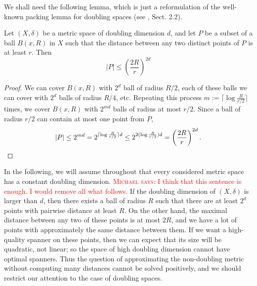 \documentclass[a4paper,USenglish]{socg-lipics-v2018}
\newcommand{\dist}{\delta}
\def\marrow{\marginpar[\hfill$\longrightarrow$]{$\longleftarrow$}}
\def\michael#1{\textcolor{red}{\textsc{Michael says: }{\marrow\sf #1}}}
\begin{document}
We shall need the following lemma, which is just a reformulation of the well-known
packing lemma for doubling spaces (see \cite{smid_2009}, Sect. 2.2).

\begin{lemma}
\label{lem:packing_lemma}
 Let $(X,\dist)$ be a metric space of doubling dimension $d$, and let $P$ be a subset of a ball 
 $B(x,R)$ in $X$ such that the distance between any two distinct points of $P$ is at least $r$.
 Then 
 \[|P|\leq \left(\frac{2R}{r}\right)^{2d}\]

\end{lemma}
\begin{proof}
We can cover $B(x,R)$ with $2^d$ ball of radius $R/2$, each of these balls we can cover with $2^d$
balls of radius $R/4$, etc. Repeating this process $m := \lceil \log \frac{R}{r/2} \rceil$ times, 
we cover
$B(x, R)$ with $2^{md}$ balls of radius at most $r/2$. Since a ball of radius $r/2$ can
contain at most one point from $P$, 
\[|P|\leq 2^{md}= 2^{\lceil \log \frac{R}{r/2} \rceil d}\leq 2^{2(\log \frac{R}{r/2})d}=\left(\frac{2R}{r}\right)^{2d}.\qedhere\]
\end{proof}

In the following, we will assume throughout that every considered metric space
has a constant doubling dimension.
\michael{I think that this sentence is enough. I would remove all what follows.}
If the doubling dimension of $(X, \dist)$ is larger than $d$, then
there exists a ball of radius $R$ such that there are at least $2^d$ points with pairwise distance at least $R$. On the other hand,
the maximal distance between any two of these points is at most $2R$, and we have a lot of points with approximately the same distance
between them. If we want a high-quality spanner on these points, then we can expect that its size will be quadratic, not linear;
so the space of high doubling dimension cannot have optimal spanners. Thus the question of approximating
the non-doubling metric without computing many distances cannot be solved positively, and we should
restrict our attention to the case of doubling spaces.
\end{document}
